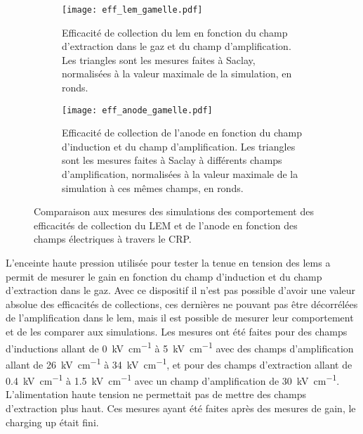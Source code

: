       \begin{figure}[htpb]
        \begin{subfigure}{0.48\textwidth}
          \centering
          \texttt{[image: eff\_lem\_gamelle.pdf]}
          \caption{\label{fig::eff_lem_gamelle}Efficacité de collection du \gls{lem} en fonction du champ d'extraction dans le gaz et du champ d'amplification. Les triangles sont les mesures faites à Saclay, normalisées à la valeur maximale de la simulation, en ronds.}
        \end{subfigure}\hfill
        \begin{subfigure}{0.48\textwidth}
          \centering
          \texttt{[image: eff\_anode\_gamelle.pdf]}
          \caption{\label{fig::eff_anode_gamelle}Efficacité de collection de l'anode en fonction du champ d'induction et du champ d'amplification. Les triangles sont les mesures faites à Saclay à différents champs d'amplification, normalisées à la valeur maximale de la simulation à ces mêmes champs, en ronds.}
        \end{subfigure}
        \caption[Comparaison aux mesures des simulations des efficacités de collection du LEM et de l'anode en fonction des champs électriques à travers le CRP]{\label{fig::eff_gamelle}Comparaison aux mesures des simulations des comportement des efficacités de collection du LEM et de l'anode en fonction des champs électriques à travers le CRP.}
      \end{figure}
      
      L'enceinte haute pression utilisée pour tester la tenue en tension des \glspl{lem} a permit de mesurer le gain en fonction du champ d'induction et du champ d'extraction dans le gaz. Avec ce dispositif il n'est pas possible d'avoir une valeur absolue des efficacités de collections, ces dernières ne pouvant pas être décorrélées de l'amplification dans le \gls{lem}, mais il est possible de mesurer leur comportement et de les comparer aux simulations. Les mesures ont été faites pour des champs d'inductions allant de \SI{0}{\kilo\volt\per\centi\meter} à \SI{5}{\kilo\volt\per\centi\meter} avec des champs d'amplification allant de \SI{26}{\kilo\volt\per\centi\meter} à \SI{34}{\kilo\volt\per\centi\meter}, et pour des champs d'extraction allant de \SI{0.4}{\kilo\volt\per\centi\meter} à \SI{1.5}{\kilo\volt\per\centi\meter} avec un champ d'amplification de \SI{30}{\kilo\volt\per\centi\meter}. L'alimentation haute tension ne permettait pas de mettre des champs d'extraction plus haut. Ces mesures ayant été faites après des mesures de gain, le charging up était fini. 

